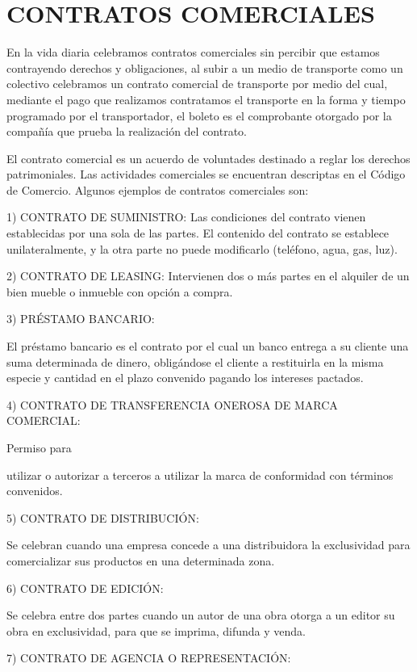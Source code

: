 \section*{CONTRATOS COMERCIALES}
En la vida diaria celebramos contratos comerciales sin percibir que estamos contrayendo derechos y obligaciones, al subir a un medio de transporte como un colectivo celebramos un contrato comercial de transporte por medio del cual, mediante el pago que realizamos contratamos el transporte en la forma y tiempo programado por el transportador, el boleto es el comprobante otorgado por la compañía que prueba la realización del contrato.

El contrato comercial es un acuerdo de voluntades destinado a reglar los derechos patrimoniales. Las actividades comerciales se encuentran descriptas en el Código de Comercio. Algunos ejemplos de contratos comerciales son:

1) CONTRATO DE SUMINISTRO: Las condiciones del contrato vienen establecidas por una sola de las partes. El contenido del contrato se establece unilateralmente, y la otra parte no puede modificarlo (teléfono, agua, gas, luz).

2) CONTRATO DE LEASING: Intervienen dos o más partes en el alquiler de un bien mueble o inmueble con opción a compra.



3) PRÉSTAMO BANCARIO:

El préstamo bancario es el contrato por el cual un banco entrega a su cliente una suma determinada de dinero, obligándose el cliente a restituirla en la misma especie y cantidad en el plazo convenido pagando los intereses pactados.

4) CONTRATO DE TRANSFERENCIA ONEROSA DE MARCA COMERCIAL:

{\raggedleft Permiso para\par}

utilizar o autorizar a terceros a utilizar la marca de conformidad con términos convenidos.

5) CONTRATO DE DISTRIBUCIÓN:

Se celebran cuando una empresa concede a una distribuidora la exclusividad para comercializar sus productos en una determinada zona.

6) CONTRATO DE EDICIÓN:

Se celebra entre dos partes cuando un autor de una obra otorga a un editor su obra en exclusividad, para que se imprima, difunda y venda.

7) CONTRATO DE AGENCIA O REPRESENTACIÓN:

